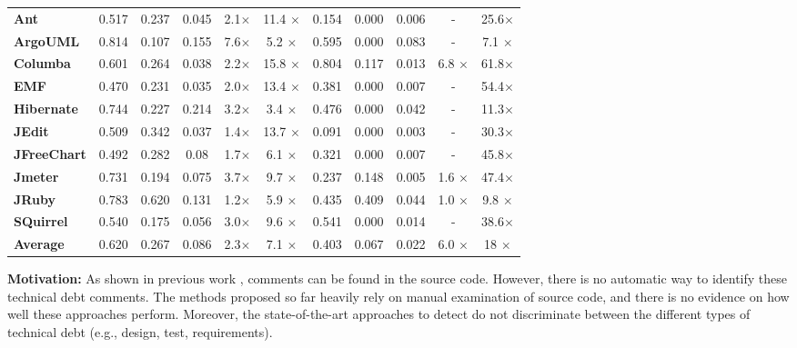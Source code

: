 \begin{table}[!thb]
\begin{center}
\begin{tabular}{l| c c c c c| c c c c c}
        \midrule                                                  
        \textbf{Ant}       &0.517&0.237&0.045&2.1$\times$& 11.4 $\times$&0.154&0.000&0.006&-             & 25.6$\times$  \\
        \textbf{ArgoUML}   &0.814&0.107&0.155&7.6$\times$& 5.2  $\times$&0.595&0.000&0.083&-             & 7.1 $\times$  \\
        \textbf{Columba}   &0.601&0.264&0.038&2.2$\times$& 15.8 $\times$&0.804&0.117&0.013&6.8  $\times$ & 61.8$\times$  \\
        \textbf{EMF}       &0.470&0.231&0.035&2.0$\times$& 13.4 $\times$&0.381&0.000&0.007&-             & 54.4$\times$  \\
        \textbf{Hibernate} &0.744&0.227&0.214&3.2$\times$& 3.4  $\times$&0.476&0.000&0.042&-             & 11.3$\times$  \\
        \textbf{JEdit}     &0.509&0.342&0.037&1.4$\times$& 13.7 $\times$&0.091&0.000&0.003&-             & 30.3$\times$  \\
        \textbf{JFreeChart}&0.492&0.282& 0.08&1.7$\times$& 6.1  $\times$&0.321&0.000&0.007&-             & 45.8$\times$  \\
        \textbf{Jmeter}    &0.731&0.194&0.075&3.7$\times$& 9.7  $\times$&0.237&0.148&0.005&1.6 $\times$  & 47.4$\times$  \\
        \textbf{JRuby}     &0.783&0.620&0.131&1.2$\times$& 5.9  $\times$&0.435&0.409&0.044&1.0 $\times$  & 9.8 $\times$  \\
        \textbf{SQuirrel}  &0.540&0.175&0.056&3.0$\times$& 9.6  $\times$&0.541&0.000&0.014&-             & 38.6$\times$  \\
        \midrule 
        \textbf{Average}   &0.620&0.267&0.086&2.3$\times$&7.1   $\times$&0.403&0.067&0.022&6.0 $\times$  &  18 $\times$  \\ 
        \bottomrule
        \end{tabular}
    \end{center}    
\end{table}

\vspace{3mm}
\noindent\rqi
\vspace{3mm}

\noindent \textbf{Motivation:} As shown in previous work \cite{Maldonado2015MTD}, \SATD comments can be found in the source code. However, there is no automatic way to identify these technical debt comments. The methods proposed so far heavily rely on manual examination of source code, and there is no evidence on how well these approaches perform. Moreover, the state-of-the-art approaches to detect \SATD do not discriminate between the different types of technical debt (e.g., design, test, requirements).

